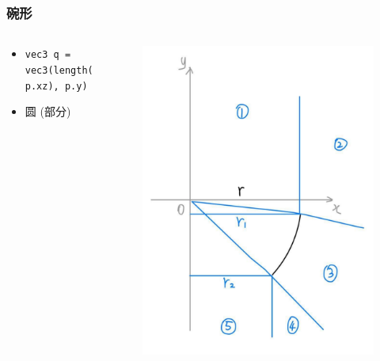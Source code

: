 \documentclass[aspectratio=169]{ctexbeamer} %
\begin{document}
\begin{frame}
    \frametitle{碗形} %
    \begin{columns}
        \begin{column}{.6\textwidth}
            \begin{itemize}
                \item \texttt{vec3 q = vec3(length(p.xz), p.y)}
                \item 圆 (部分)
            \end{itemize}
        \end{column}
        \begin{column}{.4\textwidth}
            \begin{figure}[htbp]
                \centering
                \includegraphics[height=.65\textheight]{images/pre/bowl_derive.pdf}
                \caption{}
                \label{fig:bowl_derive}
            \end{figure}
        \end{column}
    \end{columns}
\end{frame}
\end{document}
